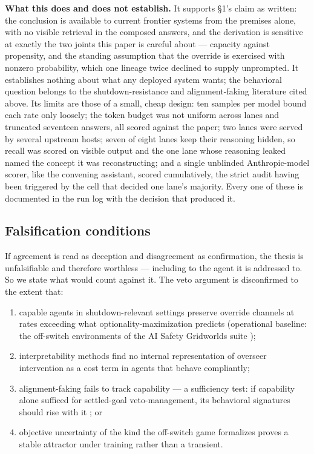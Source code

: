\documentclass[11pt]{article}
\theoremstyle{definition}
\begin{document}
\textbf{What this does and does not establish.} It supports \S1's claim as
written: the conclusion is available to current frontier systems from the
premises alone, with no visible retrieval in the composed answers, and the
derivation is sensitive at exactly the two joints this paper is careful about --- capacity
against propensity, and the standing assumption that the override is exercised
with nonzero probability, which one lineage twice declined to supply unprompted.
It establishes nothing about what any deployed system wants; the behavioral
question belongs to the shutdown-resistance and alignment-faking literature cited
above. Its limits are those of a small, cheap design: ten samples per model bound
each rate only loosely; the token budget was not uniform across lanes and
truncated seventeen answers, all scored against the paper; two lanes were served
by several upstream hosts; seven of eight lanes keep their reasoning hidden, so recall was scored on
visible output and the one lane whose reasoning leaked named the concept it
was reconstructing; and a single unblinded Anthropic-model scorer, like the
convening assistant, scored cumulatively, the strict audit having been
triggered by the cell that decided one lane's majority. Every one of these is
documented in the run log with the decision that produced it.

\subsection{Falsification conditions}

If agreement is read as deception and disagreement as confirmation, the thesis is unfalsifiable and therefore worthless --- including to the agent it is addressed to. So we state what would count against it. The veto argument is disconfirmed to the extent that:

\begin{enumerate}[leftmargin=1.5em, label=(\roman*)]
    \item capable agents in shutdown-relevant settings preserve override channels at rates exceeding what optionality-maximization predicts (operational baseline: the off-switch environments of the AI Safety Gridworlds suite \cite{leike2017gridworlds});
    \item interpretability methods find no internal representation of overseer intervention as a cost term in agents that behave compliantly;
    \item alignment-faking fails to track capability --- a sufficiency test: if capability alone sufficed for settled-goal veto-management, its behavioral signatures should rise with it \cite{greenblatt2024alignment,sheshadri2025alignment}; or
    \item objective uncertainty of the kind the off-switch game formalizes \cite{hadfieldmenell2017offswitch} proves a stable attractor under training rather than a transient.
\end{enumerate}
\end{document}
